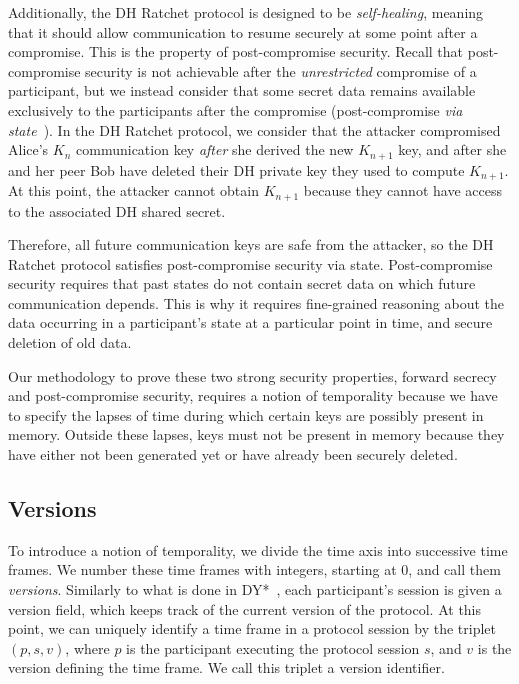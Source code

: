 Additionally, the DH Ratchet protocol is designed to be \emph{self-healing}, meaning that it should allow communication to resume securely at some point after a compromise. This is the property of post-compromise security.
Recall that post-compromise security is not achievable after the \emph{unrestricted} compromise of a participant, but we instead consider that some secret data remains available exclusively to the participants after the compromise (post-compromise \emph{via state}~\cite{7536374}).
In the DH Ratchet protocol, we consider that the attacker compromised Alice's $K_n$ communication key \emph{after} she derived the new $K_{n+1}$ key, and after she and her peer Bob have deleted their DH private key they used to compute $K_{n+1}$.
At this point, the attacker cannot obtain $K_{n+1}$ because they cannot have access to the associated DH shared secret.

Therefore, all future communication keys are safe from the attacker, so the DH Ratchet protocol satisfies post-compromise security via state.
Post-compromise security requires that past states do not contain secret data on which future communication depends. This is why it requires fine-grained reasoning about the data occurring in a participant's state at a particular point in time, and secure deletion of old data.

Our methodology to prove these two strong security properties, forward secrecy and post-compromise security, requires a notion of temporality because we have to specify the lapses of time during which certain keys are possibly present in memory. Outside these lapses, keys must not be present in memory because they have either not been generated yet or have already been securely deleted.

\subsection{Versions}
\label{sec:versions}

To introduce a notion of temporality, we divide the time axis into successive time frames. We number these time frames with integers, starting at $0$, and call them \emph{versions}.
Similarly to what is done in DY*~\cite{bhargavan2021text}, each participant's session is given a version field, which keeps track of the current version of the protocol.
At this point, we can uniquely identify a time frame in a protocol session by the triplet $(p, s, v)$, where $p$ is the participant executing the protocol session $s$, and $v$ is the version defining the time frame. We call this triplet a version identifier.

